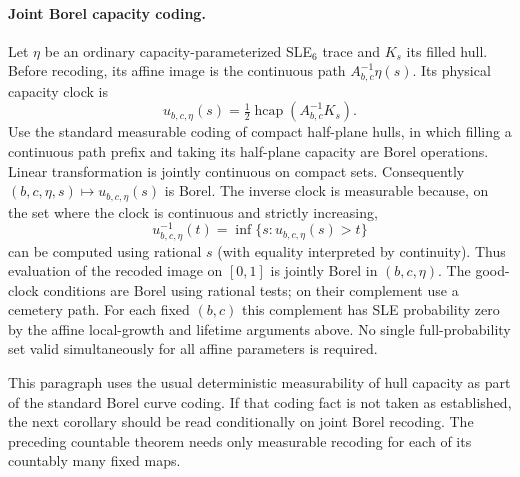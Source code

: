 \documentclass[11pt]{article}
\theoremstyle{definition}\newtheorem{definition}[theorem]{Definition}
\theoremstyle{remark}\newtheorem{remark}[theorem]{Remark}
\begin{document}
\paragraph{Joint Borel capacity coding.}
Let $\eta$ be an ordinary capacity-parameterized SLE$_6$ trace and $K_s$ its
filled hull. Before recoding, its affine image is the continuous path
$A_{b,c}^{-1}\eta(s)$. Its physical capacity clock is
\[
 u_{b,c,\eta}(s)=\tfrac12\operatorname{hcap}(A_{b,c}^{-1}K_s).
 \tag{SG6}
\]
Use the standard measurable coding of compact half-plane hulls, in which
filling a continuous path prefix and taking its half-plane capacity are
Borel operations. Linear transformation is jointly continuous on compact
sets. Consequently $(b,c,\eta,s)\mapsto u_{b,c,\eta}(s)$ is Borel.
The inverse clock is measurable because, on the set where the clock is
continuous and strictly increasing,
\[
 u_{b,c,\eta}^{-1}(t)=\inf\{s:u_{b,c,\eta}(s)>t\}
\]
can be computed using rational $s$ (with equality interpreted by continuity).
Thus evaluation of the recoded image on $[0,1]$ is jointly Borel in
$(b,c,\eta)$. The good-clock conditions are Borel using rational tests;
on their complement use a cemetery path. For each fixed $(b,c)$ this
complement has SLE probability zero by the affine local-growth and lifetime
arguments above. No single full-probability set valid simultaneously for
all affine parameters is required.

This paragraph uses the usual deterministic measurability of hull capacity
as part of the standard Borel curve coding. If that coding fact is not
taken as established, the next corollary should be read conditionally on
joint Borel recoding. The preceding countable theorem needs only measurable
recoding for each of its countably many fixed maps.
\end{document}
